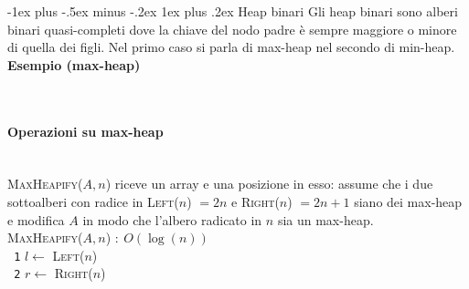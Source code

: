\documentclass[10pt,landscape]{article}
\makeatletter
\renewcommand{\subsubsection}{\@startsection{subsubsection}{3}{0mm}%
                                {-1ex plus -.5ex minus -.2ex}%
                                {1ex plus .2ex}%
                                {\normalfont\normalsize\bfseries}}
\newcommand{\myparagraph}[1]{\paragraph{#1}\mbox{}\\ [5pt]}
\makeatother
\begin{document}
\begin{multicols*}{4}
                \subsubsection{Heap binari}
                Gli heap binari sono alberi binari quasi-completi dove la chiave del nodo padre è sempre maggiore o minore di quella dei figli. Nel primo caso si parla di max-heap nel secondo di min-heap.\\ [3pt]
                \textbf{Esempio (max-heap)} \\ [3pt]
                \begin{center}
                         \\ [7pt]
                \end{center}
                \myparagraph{Operazioni su max-heap}
                \textsc{MaxHeapify}($A,n$) riceve un array e una posizione in esso: assume che i due sottoalberi con radice in \textsc{Left}($n$) $= 2n$ e \textsc{Right}($n$) $= 2n + 1$ siano dei max-heap e modifica $A$ in modo che l’albero radicato in $n$ sia un max-heap. \\ [5pt]
                \textsc{MaxHeapify($A,n$)} $:\ O(\log(n))$                                     \\ [3pt]
                \texttt{ 1}\hspace*{0.5em} $l \leftarrow$ \textsc{Left($n$)}                      \\
                \texttt{ 2}\hspace*{0.5em} $r \leftarrow$ \textsc{Right($n$)}                     \\

\end{multicols*}
\end{document}
